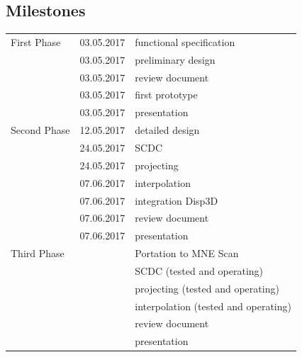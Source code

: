 \subsection{Milestones}
\begin{tabular}{lll}
    First Phase & 03.05.2017 & functional specification \\
                & 03.05.2017 & preliminary design\\
                & 03.05.2017 & review document\\
                & 03.05.2017 & first prototype\\
                & 03.05.2017 & presentation\\
    Second Phase & 12.05.2017 & detailed design\\
                 & 24.05.2017 & SCDC\\
                 & 24.05.2017 & projecting\\
                 & 07.06.2017 & interpolation\\
                 & 07.06.2017 & integration Disp3D\\
                 & 07.06.2017 & review document\\
                 & 07.06.2017 & presentation\\
    Third Phase & & Portation to MNE Scan\\
                & & SCDC (tested and operating)\\
                & & projecting (tested and operating)\\
                & & interpolation (tested and operating)\\
                & & review document\\
                & & presentation\\
\end{tabular}

%	
%	




